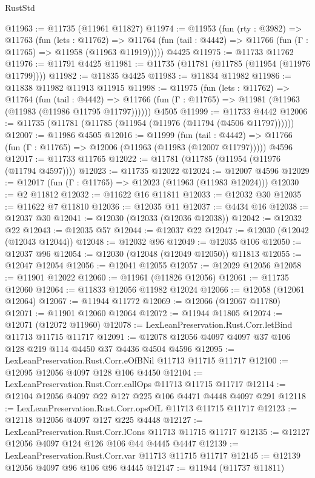 \begin{lexlean}{RustStd}
\begin{coremodule}
@11963 := @11735 (@11961 @11827)
@11974 := @11953
    (fun (rty : @3982) =>
    @11763
      (fun (lets : @11762) =>
      @11764 (fun (tail : @4442) => @11766 (fun (Γ : @11765) => @11958 (@11963 @11919)))))
    @4425
@11975 := @11733 @11762
@11976 := @11791 @4425
@11981 := @11735 (@11781 (@11785 (@11954 (@11976 @11799))))
@11982 := @11835 @4425
@11983 := @11834 @11982
@11986 := @11838 @11982 @11913 @11915
@11998 := @11975
    (fun (lets : @11762) =>
    @11764
      (fun (tail : @4442) =>
      @11766 (fun (Γ : @11765) => @11981 (@11963 (@11983 (@11986 @11795 @11797))))))
    @4505
@11999 := @11733 @4442
@12006 := @11735 (@11781 (@11785 (@11954 (@11976 (@11794 (@4506 @11797))))))
@12007 := @11986 @4505
@12016 := @11999
    (fun (tail : @4442) => @11766 (fun (Γ : @11765) => @12006 (@11963 (@11983 (@12007 @11797)))))
    @4596
@12017 := @11733 @11765
@12022 := @11781 (@11785 (@11954 (@11976 (@11794 @4597))))
@12023 := @11735 @12022
@12024 := @12007 @4596
@12029 := @12017 (fun (Γ : @11765) => @12023 (@11963 (@11983 @12024)))
@12030 := @2 @11812
@12032 := @11622 @16 @11811
@12033 := @12032 @30
@12035 := @11622 @7 @11810
@12036 := @12035 @11
@12037 := @4434 @16
@12038 := @12037 @30
@12041 := @12030 (@12033 (@12036 @12038))
@12042 := @12032 @22
@12043 := @12035 @57
@12044 := @12037 @22
@12047 := @12030 (@12042 (@12043 @12044))
@12048 := @12032 @96
@12049 := @12035 @106
@12050 := @12037 @96
@12054 := @12030 (@12048 (@12049 @12050)) @11813
@12055 := @12047 @12054
@12056 := @12041 @12055
@12057 := @12029 @12056
@12058 := @11901 @12022
@12060 := @11961 (@11826 @12056)
@12061 := @11735 @12060
@12064 := @11833 @12056 @11982 @12024
@12066 := @12058 (@12061 @12064)
@12067 := @11944 @11772
@12069 := @12066 (@12067 @11780)
@12071 := @11901 @12060 @12064
@12072 := @11944 @11805
@12074 := @12071 (@12072 @11960)
@12078 := LexLeanPreservation.Rust.Corr.letBind @11713 @11715 @11717
@12091 := @12078 @12056 @4097 @4097 @37 @106 @128 @219 @114 @4450 @37 @4436 @4504 @4596
@12095 := LexLeanPreservation.Rust.Corr.eOfBNil @11713 @11715 @11717
@12100 := @12095 @12056 @4097 @128 @106 @4450
@12104 := LexLeanPreservation.Rust.Corr.callOps @11713 @11715 @11717
@12114 := @12104 @12056 @4097 @22 @127 @225 @106 @4471 @4448 @4097 @291
@12118 := LexLeanPreservation.Rust.Corr.opsOfL @11713 @11715 @11717
@12123 := @12118 @12056 @4097 @127 @225 @4448
@12127 := LexLeanPreservation.Rust.Corr.lCons @11713 @11715 @11717
@12135 := @12127 @12056 @4097 @124 @126 @106 @44 @4445 @4447
@12139 := LexLeanPreservation.Rust.Corr.var @11713 @11715 @11717
@12145 := @12139 @12056 @4097 @96 @106 @96 @4445
@12147 := @11944 (@11737 @11811)

\end{coremodule}
\end{lexlean}
